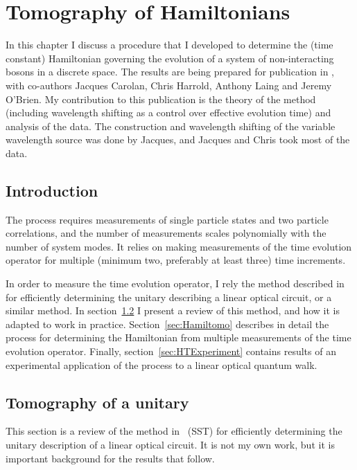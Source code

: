 \chapter{Tomography of Hamiltonians}
\label{ch:Hamiltomo}
In this chapter I discuss a procedure that I developed to determine the
(time constant) Hamiltonian governing the evolution of a system of
non-interacting bosons in a discrete space. The results are being prepared for
publication in \cite{hamiltomo}, with co-authors Jacques Carolan, Chris Harrold,
Anthony Laing and Jeremy O'Brien. My contribution to this publication is the
theory of the method (including wavelength shifting as a control over effective
evolution time) and analysis of the data. The construction and wavelength
shifting of the variable wavelength source was done by Jacques, and Jacques and
Chris took most of the data.

\section{Introduction}
\label{sec:HTIntro}
The process requires measurements of
single particle states and two particle correlations, and the number of
measurements scales polynomially with the number of system modes. It relies on
making measurements of the time evolution operator for multiple (minimum two,
preferably at least three) time increments.

In order to measure the time
evolution operator, I rely the method described in~\cite{sst} for efficiently
determining the unitary describing a linear optical circuit, or a similar
method. In section~\ref{sec:SST} I present a review of this method, and how it
is adapted to work in practice. Section~\ref{sec:Hamiltomo} describes in detail
the process for determining the Hamiltonian from multiple measurements of the
time evolution operator. Finally, section~\ref{sec:HTExperiment} contains
results of an experimental application of the process to a linear optical
quantum walk.

\section{Tomography of a unitary}
\label{sec:SST}
This section is a review of the method in~\cite{sst} (SST) for efficiently
determining the unitary description of a linear optical circuit. It is not my
own work, but it is important background for the results that follow.

